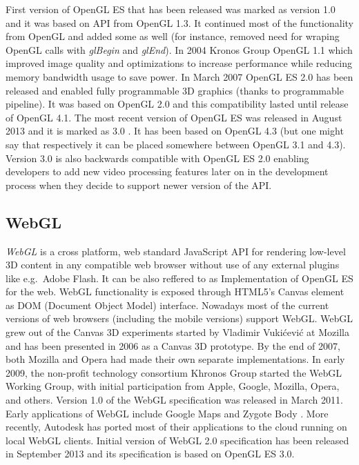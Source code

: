 First version of OpenGL ES that has been released was marked as version 1.0 and it was based on API from OpenGL 1.3.
It continued most of the functionality from OpenGL and added some as well (for instance, removed need for wraping OpenGL calls with \emph{glBegin} and \emph{glEnd}).
\newline In 2004 Kronos Group OpenGL 1.1 which improved image quality and optimizations to increase performance while reducing memory bandwidth usage to save power.
\newline In March 2007 OpenGL ES 2.0 has been released and enabled fully programmable 3D graphics (thanks to programmable pipeline).
It was based on OpenGL 2.0 and this compatibility lasted until release of OpenGL 4.1.
\newline The most recent version of OpenGL ES was released in August 2013 and it is marked as 3.0 \cite{opengl_es3_spec}.
It has been based on OpenGL 4.3 (but one might say that respectively it can be placed somewhere between OpenGL 3.1 and 4.3).
Version 3.0 is also backwards compatible with OpenGL ES 2.0 enabling developers to add new video processing features later on in the development process when they decide to support newer version of the API.

\subsection{WebGL}
\emph{WebGL} \cite{webgl_kronos} is a cross platform, web standard JavaScript API for rendering low-level 3D content in any compatible web browser without use of any external plugins like e.g.\ Adobe Flash.
It can be also reffered to as Implementation of OpenGL ES for the web.
WebGL functionality is exposed through HTML5's Canvas element as DOM (Document Object Model) interface.
Nowadays most of the current versions of web browsers (including the mobile versions) support WebGL.
WebGL grew out of the Canvas 3D experiments started by Vladimir Vukićević at Mozilla and has been presented in 2006 as a Canvas 3D prototype.
By the end of 2007, both Mozilla and Opera had made their own separate implementations.
In early 2009, the non-profit technology consortium Khronos Group started the WebGL Working Group, with initial participation from Apple, Google, Mozilla, Opera, and others.
Version 1.0 of the WebGL specification was released in March 2011.
Early applications of WebGL include Google Maps and Zygote Body \cite{zygote_body}.
More recently, Autodesk has ported most of their applications to the cloud running on local WebGL clients.
Initial version of WebGL 2.0 specification has been released in September 2013 and its specification is based on OpenGL ES 3.0.

